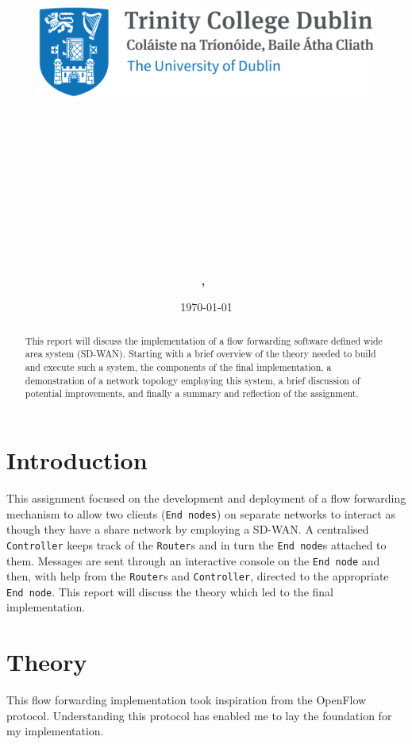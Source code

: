 \documentclass{article}
\title{
\vspace{-1in}
\begin{figure}[!ht]
\flushleft
\includegraphics[width=0.4\linewidth]{reduced-trinity.png}
\end{figure}
\vspace{-0.5cm}
\hrulefill \\
\vspace{0.5cm}
\textmd{\textbf{\moduleCode\ \moduleName}}\\
\textmd{\textbf{\assignmentTitle}}\\
\vspace{0.5cm}
\hrulefill \\
}
\author{\textbf{\authorName,\ \authorID}}
\date{\today}
\newcommand{\code}[1]{\texttt{#1}}
\begin{document}
\captionsetup{width=.8\linewidth} 

\maketitle
\tableofcontents
\vspace{0.5in}

\begin{abstract}
	This report will discuss the implementation of a flow forwarding software defined wide area system (SD-WAN). Starting with a brief overview of the theory needed to build and execute such a system, the components of the final implementation, a demonstration of a network topology employing this system, a brief discussion of potential improvements, and finally a summary and reflection of the assignment.
\end{abstract}

\newpage
\section{Introduction}
This assignment focused on the development and deployment of a flow forwarding mechanism to allow two clients (\code{End nodes}) on separate networks to interact as though they have a share network by employing a SD-WAN. A centralised \code{Controller} keeps track of the \code{Router}s and in turn the \code{End node}s attached to them. Messages are sent through an interactive console on the \code{End node} and then, with help from the \code{Router}s and \code{Controller}, directed to the appropriate \code{End node}.
This report will discuss the theory which led to the final implementation.

\vspace{1cm}
\section{Theory}
This flow forwarding implementation took inspiration from the OpenFlow \cite{openflow} protocol. Understanding this protocol has enabled me to lay the foundation for my implementation.
\end{document}
